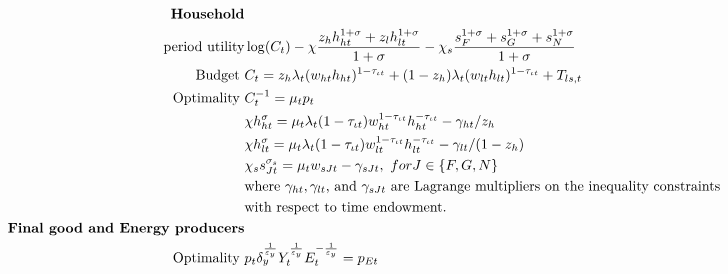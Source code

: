 \begin{align}
\text{\textbf{Household}}&\nonumber\\ \text{period utility}\vspace{4mm}&  \log(C_t)-\chi\frac{z_hh_{ht}^{1+\sigma}+z_lh_{lt}^{1+\sigma}}{1+\sigma}-\chi_s\frac{s_F^{1+\sigma}+s_G^{1+\sigma}+s_N^{1+\sigma}}{{1+\sigma}} \nonumber %
\\
\text{Budget}\ \vspace{4mm}& C_t=z_h \lambda_t (w_{ht}h_{ht})^{1-\tau_{\iota t}}+(1-z_h) \lambda_t (w_{lt}h_{lt})^{1-\tau_{\iota t}}+T_{ls, t}\nonumber\\ %
\text{Optimality}\ \vspace{4mm}
& C_t^{-1}= \mu_tp_{t}\nonumber\\
& \chi h_{ht}^{\sigma}=\mu_t \lambda_t(1-\tau_{\iota t})w_{ht}^{1-\tau_{\iota t}}h_{ht}^{-\tau_{\iota t}}-\gamma_{ht}/z_h\nonumber\\
& \chi h_{lt}^{\sigma}=\mu_t \lambda_t(1-\tau_{\iota t})w_{lt}^{1-\tau_{\iota t}}h_{lt}^{-\tau_{\iota t}}-\gamma_{lt}/(1-z_h)\nonumber\\
& \chi_s s_{Jt}^{\sigma_s} =\mu_t w_{sJt}-\gamma_{sJt},\ for  J\in\{F,G,N\} \nonumber\\ %
& \text{where $\gamma_{ht}, \gamma_{lt}$, and $\gamma_{sJt}$ are Lagrange multipliers on the inequality constraints}\nonumber \\ & \text{with respect to time endowment.}\\
\text{\textbf{Final good and Energy producers}}&\nonumber\\
\text{Optimality}\ \vspace{4mm}&
 p_{t}\delta_y^\frac{1}{\varepsilon_y}Y_t^\frac{1}{\varepsilon_y}E_t^{-\frac{1}{\varepsilon_y}}=p_{Et}\nonumber\\

\end{align}
